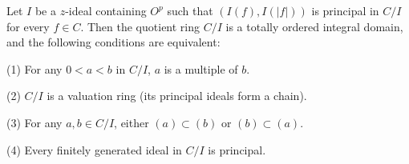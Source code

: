 Let $I$ be a $z$-ideal containing $O^p$ such that $(I(f), I(|f|))$ is principal in $C/I$ for every $f \in C$. Then the quotient ring $C/I$ is a totally ordered integral domain, and the following conditions are equivalent:

(1) For any $0 < a < b$ in $C/I$, $a$ is a multiple of $b$.

(2) $C/I$ is a valuation ring (its principal ideals form a chain).

(3) For any $a, b \in C/I$, either $(a) \subset (b)$ or $(b) \subset (a)$.

(4) Every finitely generated ideal in $C/I$ is principal.
